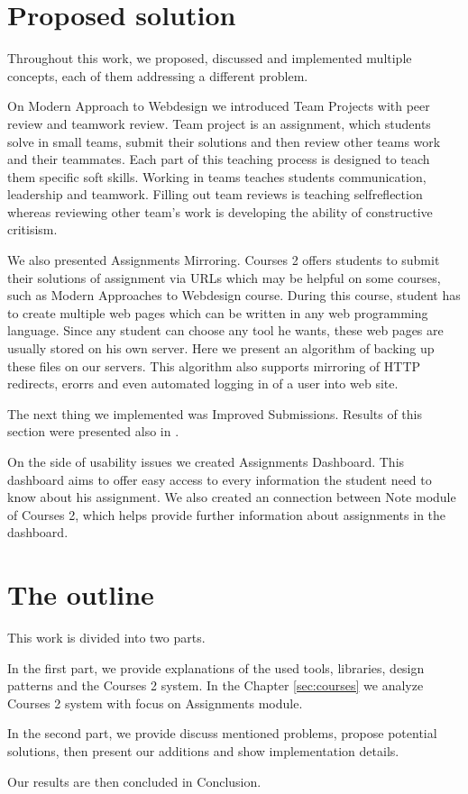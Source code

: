 \section*{Proposed solution}
Throughout this work, we proposed, discussed and implemented multiple concepts, each of them addressing a different problem.

On Modern Approach to Webdesign we introduced Team Projects with peer review and teamwork review. Team project is an assignment, which students solve in small teams, submit their solutions and then review other teams work and their teammates. Each part of this teaching process is designed to teach them specific soft skills. Working in teams teaches students communication, leadership and teamwork. Filling out team reviews is teaching self\-reflection whereas reviewing other team's work is developing the ability of constructive critisism.

We also presented Assignments Mirroring. Courses 2 offers students to submit their solutions of assignment via URLs which may be helpful on some courses, such as Modern Approaches to Webdesign course. During this course, student has to create multiple web pages which can be written in any web programming language. Since any student can choose any tool he wants, these web pages are usually stored on his own server. Here we present an algorithm of backing up these files on our servers. This algorithm also supports mirroring of HTTP redirects, erorrs and even automated logging in of a user into web site.

The next thing we implemented was Improved Submissions. Results of this section were presented also in \cite{peerreview}.

On the side of usability issues we created Assignments Dashboard. This dashboard aims to offer easy access to every information the student need to know about his assignment. We also created an connection between Note module of Courses 2, which helps provide further information about assignments in the dashboard.


\section*{The outline}
This work is divided into two parts.

In the first part, we provide explanations of the used tools, libraries, design patterns and the Courses 2 system. In the Chapter \ref{sec:courses} we analyze Courses 2 system with focus on Assignments module.

In the second part, we provide discuss mentioned problems, propose potential solutions, then present our additions and show implementation details.

Our results are then concluded in Conclusion.

